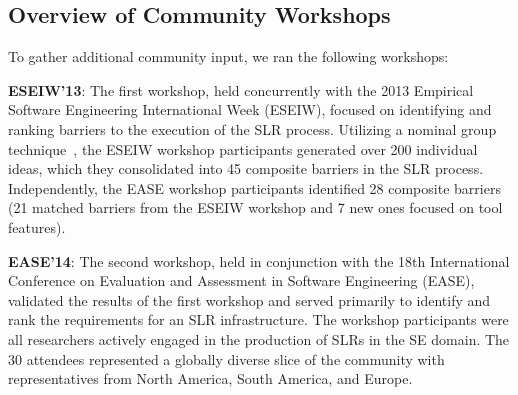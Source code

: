 \subsection{Overview of Community Workshops}\label{sect:work}
\noindent
To gather additional community input, we ran the following workshops:
\bi
\item \textbf{ESEIW'13}: 
The first workshop, held concurrently with the 2013 Empirical Software Engineering International Week (ESEIW), focused on identifying and ranking barriers to the execution of the SLR process.  
Utilizing a nominal group technique~\cite{Delbecq-etal:75,Lethbridge-etal:00}, the ESEIW workshop participants generated over 200 individual ideas, which they consolidated into 45 composite barriers in the SLR process. 
Independently, the EASE workshop participants identified 28 composite barriers (21 matched barriers from the ESEIW workshop and 7 new ones focused on tool features).
\item \textbf{EASE'14}:
The second workshop, held in conjunction with the 18th International Conference on Evaluation and Assessment in Software Engineering (EASE), validated the results of the first workshop and served primarily to identify and rank the requirements for an SLR infrastructure.
The workshop participants were all researchers actively engaged in the production of SLRs in the SE domain.  
The 30 attendees represented a globally diverse slice of the community with representatives from North America, South America, and Europe.  
\ei


